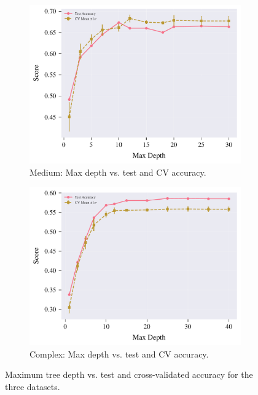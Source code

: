 \documentclass[conference]{IEEEtran}
\begin{document}
\begin{figure}[H]
  \begin{subfigure}[b]{\columnwidth}
    \centering
    \includegraphics[width=\linewidth]{images/medium_depth_accuracy.pdf}
    \caption{Medium: Max depth vs. test and CV accuracy.}
    \label{fig:exp1-medium-acc}
  \end{subfigure}\vspace{6pt}

  \begin{subfigure}[b]{\columnwidth}
    \centering
    \includegraphics[width=\linewidth]{images/complex_depth_accuracy.pdf}
    \caption{Complex: Max depth vs. test and CV accuracy.}
    \label{fig:exp1-complex-acc}
  \end{subfigure}

  \caption{Maximum tree depth vs. test and cross-validated accuracy for the three datasets.}
  \label{fig:exp1-depth-acc}
\end{figure}
\end{document}
